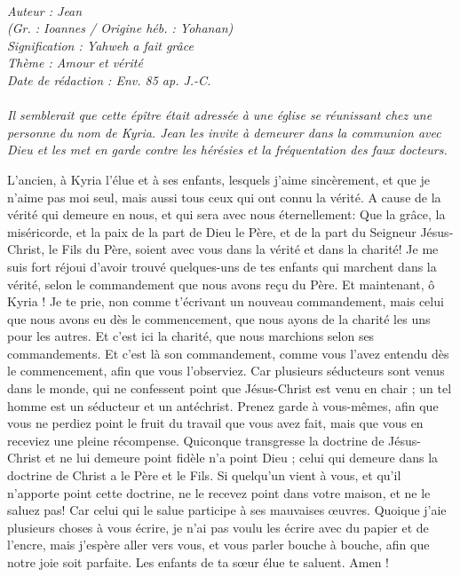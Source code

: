 \BFont
\noindent\hrulefill
{\footnotesize
\textit{
\bigskip
{\centering{}
\\Auteur : Jean
\\(Gr. : Ioannes / Origine héb. : Yohanan)
\\Signification : Yahweh a fait grâce
\\Thème : Amour et vérité
\\Date de rédaction : Env. 85 ap. J.-C.\\}
}
\textit{
\\Il semblerait que cette épître était adressée à une église se réunissant chez une personne du nom de Kyria. Jean les invite à demeurer dans la communion avec Dieu et les met en garde contre les hérésies et la fréquentation des faux docteurs.\bigskip
}
}
\par\nobreak\noindent\hrulefill
\begin{multicols}{2}
\VerseOne{}L'ancien, à Kyria l'élue et à ses enfants, lesquels j'aime sincèrement, et que je n'aime pas moi seul, mais aussi tous ceux qui ont connu la vérité.
A cause de la vérité qui demeure en nous, et qui sera avec nous éternellement:
Que la grâce, la miséricorde, et la paix de la part de Dieu le Père, et de la part du Seigneur Jésus-Christ, le Fils du Père, soient avec vous dans la vérité et dans la charité!
Je me suis fort réjoui d'avoir trouvé quelques-uns de tes enfants qui marchent dans la vérité, selon le commandement que nous avons reçu du Père.
Et maintenant, ô Kyria ! Je te prie, non comme t'écrivant un nouveau commandement, mais celui que nous avons eu dès le commencement, que nous ayons de la charité les uns pour les autres.
Et c'est ici la charité, que nous marchions selon ses commandements. Et c'est là son commandement, comme vous l'avez entendu dès le commencement, afin que vous l'observiez.
Car plusieurs séducteurs sont venus dans le monde, qui ne confessent point que Jésus-Christ est venu en chair ; un tel homme est un séducteur et un antéchrist.
Prenez garde à vous-mêmes, afin que vous ne perdiez point le fruit du travail que vous avez fait, mais que vous en receviez une pleine récompense.
Quiconque transgresse la doctrine de Jésus-Christ et ne lui demeure point fidèle n'a point Dieu ; celui qui demeure dans la doctrine de Christ a le Père et le Fils.
Si quelqu'un vient à vous, et qu'il n'apporte point cette doctrine, ne le recevez point dans votre maison, et ne le saluez pas!
Car celui qui le salue participe à ses mauvaises œuvres.
Quoique j'aie plusieurs choses à vous écrire, je n'ai pas voulu les écrire avec du papier et de l'encre, mais j'espère aller vers vous, et vous parler bouche à bouche, afin que notre joie soit parfaite.
Les enfants de ta sœur élue te saluent. Amen !
\PPE{}
\end{multicols}

